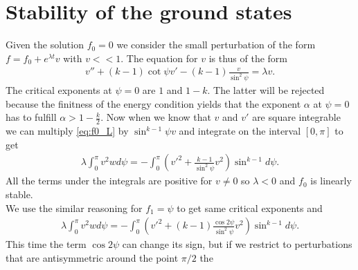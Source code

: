 \section*{Stability of the ground states}

Given the solution $f_0=0$ we consider the small perturbation of the
form $f=f_0+e^{\lambda t} v$ with $v<<1$. The equation for $v$ is thus
of the form
\begin{align}\label{eq:f0_L}
  v''+(k-1)\cot\psi v'-(k-1)\frac{v}{\sin^2\psi}=\lambda v.
\end{align}
The critical exponents at $\psi=0$ are $1$ and $1-k$. The latter will
be rejected because the finitness of the energy condition yields that
the exponent $\alpha$ at $\psi=0$ has to fulfill
$\alpha>1-\frac{k}{2}$. Now when we know that $v$ and $v'$ are square
integrable we can multiply \eqref{eq:f0_L} by $\sin^{k-1}\psi v$ and
integrate on the interval $[0,\pi]$ to get
\begin{align}
  \lambda\int_0^\pi v^2w d\psi=-\int_0^\pi\left(v'^2+\frac{k-1}{\sin^2\psi}v^2\right)\sin^{k-1}d\psi.
\end{align}
All the terms under the integrals are positive for $v\ne0$ so
$\lambda<0$ and $f_0$ is linearly stable.\\

We use the similar reasoning for $f_1=\psi$ to get same critical
exponents and
\begin{align}
  \label{eq:f1_lambda}
  \lambda\int_0^\pi v^2w d\psi=-\int_0^\pi\left(v'^2+(k-1)\frac{\cos2\psi}{\sin^2\psi}v^2\right)\sin^{k-1}d\psi.
\end{align}
This time the term $\cos2\psi$ can change its sign, but if we restrict
to perturbations that are antisymmetric around the point $\pi/2$ the


